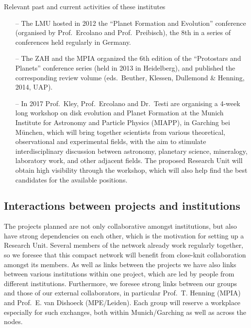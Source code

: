 \documentclass[10pt,fleqn,twoside]{article}
\begin{document}
\begin{Emphasize}
Relevant past and current activities of these institutes
\end{Emphasize}
\begin{itemize}
\item[--] The LMU hosted in 2012 the ``Planet Formation and Evolution''
conference (organised by Prof.~Ercolano and Prof.~Preibisch), the 8th
in a series of conferences held regularly in Germany.
\item[--] The ZAH and the MPIA organized the 6th edition of the
``Protostars and Planets'' conference series (held in 2013 in Heidelberg), 
and published the corresponding review volume (eds.~Beuther,
Klessen, Dullemond \& Henning, 2014, UAP).
\item[--] In 2017
Prof.~Kley, Prof.~Ercolano and Dr.~Testi are organising a 4-week
long workshop on disk evolution and Planet Formation at the Munich
Institute for Astronomy and Particle Physics (MIAPP), in Garching bei
M\"unchen, which will bring
together scientists from various theoretical, observational and
experimental fields, with the aim to stimulate interdisciplinary
discussion between astronomy, planetary science, mineralogy,
laboratory work, and other adjacent fields. The proposed Research Unit
will obtain high visibility through the workshop, which will also help
find the best candidates for the available positions. 
\end{itemize}


\subsection{Interactions between projects and institutions}
\label{sec-interactions-between-projects}
\noindent The projects planned are not only collaborative amongst institutions,
but also have strong dependencies on each other, which is the
motivation for setting up a Research Unit. Several members of the
network already work regularly together, so we foresee that this compact
network will benefit from close-knit collaboration amongst its members.
As well as links between the projects we have also links between
various institutions within one project, which are led by people from
different institutions. Furthermore, we foresee
strong links between our groups and those of our external
collaborators, in particular Prof.~T. Henning (MPIA) and Prof.~E. van
Dishoeck (MPE/Leiden). Each group will reserve a workplace especially 
for such exchanges, both within Munich/Garching as well as across the nodes. 
\end{document}
